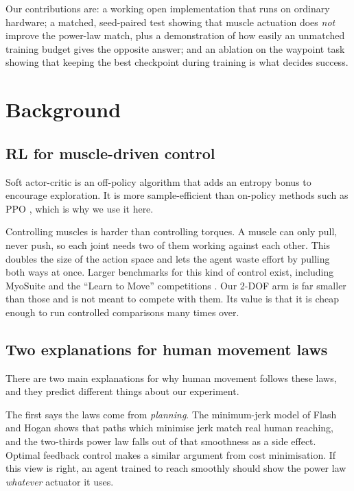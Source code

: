 \documentclass[conference]{IEEEtran}
\begin{document}
Our contributions are: a working open implementation that runs on ordinary
hardware; a matched, seed-paired test showing that muscle actuation does
\emph{not} improve the power-law match, plus a demonstration of how easily an
unmatched training budget gives the opposite answer; and an ablation on the
waypoint task showing that keeping the best checkpoint during training is what
decides success.

\section{Background}
\label{sec:background}

\subsection{RL for muscle-driven control}

Soft actor-critic \cite{haarnoja2018} is an off-policy algorithm that adds an
entropy bonus to encourage exploration. It is more sample-efficient than
on-policy methods such as PPO \cite{schulman2017}, which is why we use it here.

Controlling muscles is harder than controlling torques. A muscle can only pull,
never push, so each joint needs two of them working against each other. This
doubles the size of the action space and lets the agent waste effort by pulling
both ways at once. Larger benchmarks for this kind of control exist, including
MyoSuite \cite{caggiano2022} and the ``Learn to Move'' competitions
\cite{kidzinski2020}. Our 2-DOF arm is far smaller than those and is not meant
to compete with them. Its value is that it is cheap enough to run controlled
comparisons many times over.

\subsection{Two explanations for human movement laws}

There are two main explanations for why human movement follows these laws, and
they predict different things about our experiment.

The first says the laws come from \emph{planning}. The minimum-jerk model of
Flash and Hogan \cite{flash1985} shows that paths which minimise jerk match
real human reaching, and the two-thirds power law falls out of that smoothness
as a side effect. Optimal feedback control \cite{todorov2002} makes a similar
argument from cost minimisation. If this view is right, an agent trained to
reach smoothly should show the power law \emph{whatever} actuator it uses.
\end{document}

